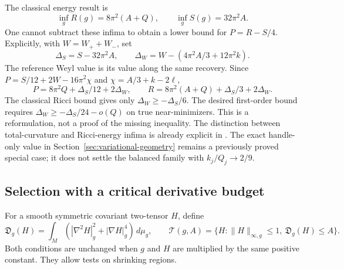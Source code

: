 The classical energy result is
\cite[Propositions~4.1--4.2 and Theorem~4.3]{LeBrun2001}
\begin{equation}\label{webvar:classical-infima}
 \inf_gR(g)=8\pi^2(A+Q),\qquad \inf_gS(g)=32\pi^2A.
\end{equation}
One cannot subtract these infima to obtain a lower bound for
$P=R-S/4$.  Explicitly, with $W=W_++W_-$, set
\[
 \Delta_S=S-32\pi^2A,\qquad
 \Delta_W=W-\left(4\pi^2A/3+12\pi^2k\right).
\]
The reference Weyl value is its value along the same recovery.
Since $P=S/12+2W-16\pi^2\chi$ and $\chi=A/3+k-2\ell$,
\begin{equation}\label{webvar:joint-energies}
 P=8\pi^2Q+\Delta_S/12+2\Delta_W,\qquad
 R=8\pi^2(A+Q)+\Delta_S/3+2\Delta_W.
\end{equation}
The classical Ricci bound gives only $\Delta_W\ge-\Delta_S/6$.
The desired first-order bound requires
$\Delta_W\ge-\Delta_S/24-o(Q)$ on true near-minimizers.
This is a reformulation, not a proof of the missing inequality.
The distinction between total-curvature and Ricci-energy infima
is already explicit in \cite[Section~11]{LeBrun2004}.  The exact
handle-only value in Section~\ref{sec:variational-geometry} remains
a previously proved special case; it does not settle the balanced
family with $k_j/Q_j\to2/9$.

\subsection{Selection with a critical derivative budget}

For a smooth symmetric covariant two-tensor $H$, define
\begin{equation}\label{webvar:test-budget}
 \mathfrak D_g(H)=\int_M
       (|\nabla^2H|_g^2+|\nabla H|_g^4)\,d\mu_g,\qquad
 \mathcal T(g,A)=
 \{H:\|H\|_{\infty,g}\le1,\ \mathfrak D_g(H)\le A\}.
\end{equation}
Both conditions are unchanged when $g$ and $H$ are multiplied by
the same positive constant.  They allow tests on shrinking regions.

